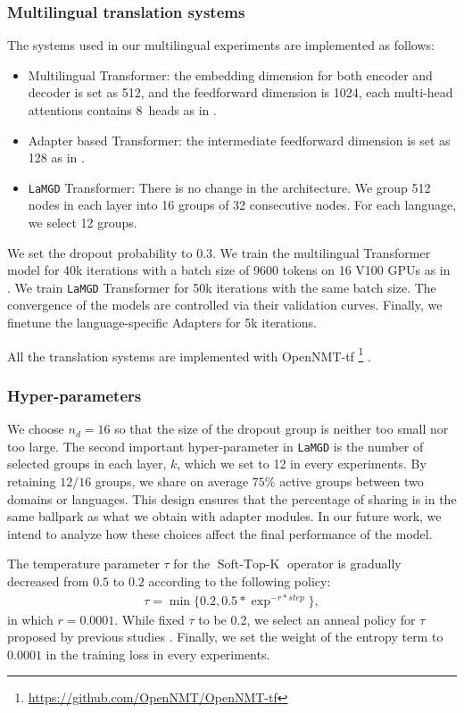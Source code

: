 \documentclass[11pt]{article}
\newcommand{\fyDone}[1]{\done[FY]\Todo[FY:]{\textcolor{orange}{#1}}}
\newcommand{\system}[1]{\texttt{{#1}}}
\begin{document}
\subsubsection{Multilingual translation systems}
The systems used in our multilingual experiments are implemented as follows:
\begin{itemize}
\item Multilingual Transformer: the embedding dimension for both encoder and decoder is set as 512, and the feedforward dimension is 1024, each multi-head attentions contains 8~heads as in \citep{Wang20balancing}.
\item Adapter based Transformer: the intermediate feedforward dimension is set as 128 as in \citep{Gong21adaptive}.
\item \system{LaMGD} Transformer: There is no change in the architecture. We group 512 nodes in each layer into 16 groups of 32 consecutive nodes. For each language, we select 12 groups.
\end{itemize}

We set the dropout probability to 0.3. We train the multilingual Transformer model for 40k iterations with a batch size of 9600 tokens on 16 V100 GPUs as in \citet{Gong21adaptive}. We train \system{LaMGD} Transformer for 50k iterations with the same batch size. The convergence of the models are controlled via their validation curves. Finally, we finetune the language-specific Adapters for 5k iterations.

All the translation systems are implemented with OpenNMT-tf \footnote{\url{https://github.com/OpenNMT/OpenNMT-tf}} \cite{Klein17opennmt}.\fyDone{Fix this, add reference to framework if needed}

\subsubsection{Hyper-parameters}
\label{ssec:hyperparams}
We choose $n_d = 16$ so that the size of the dropout group is neither too small nor too large. The second important hyper-parameter in \system{LaMGD} is the number of selected groups in each layer, $k$, which we set to 12 in every experiments. By retaining $12/16$ groups, we share on average $75 \%$ active groups between two domains or languages. This design ensures that the percentage of sharing is in the same ballpark as what we obtain with adapter modules. In our future work, we intend to analyze how these choices affect the final performance of the model.

The temperature parameter $\tau$ for the $\operatorname{Soft-Top-K}$ operator is gradually decreased from $0.5$ to $0.2$ according to the following policy:
\begin{align*}
\tau = \operatorname{min}\{ 0.2, 0.5 * \exp^{-r*step} \},
\end{align*}
in which $r=0.0001$.
While \citet{Gong21pay,Gong21adaptive} fixed $\tau$ to be 0.2, we select an anneal policy for $\tau$ proposed by previous studies \citep{Jang17categorical}. Finally, we set the weight of the entropy term to $0.0001$ in the training loss in every experiments.
\end{document}
